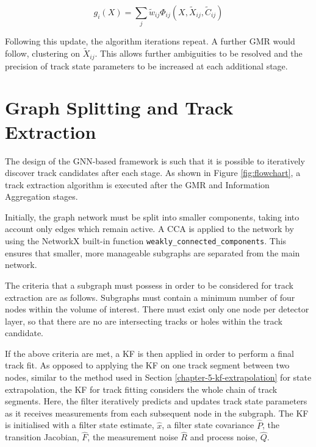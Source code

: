 \begin{equation}
g_i(X) = \sum_{j} \widetilde{w}_{ij}\Phi_{ij}(X, \widetilde{X}_{ij}, \widetilde{C}_{ij})
\label{eqn:updated-gaussian-mixture}
\end{equation}

Following this update, the algorithm iterations repeat. A further GMR would follow, clustering on $\widetilde{X}_{ij}$. This allows further ambiguities to be resolved and the precision of track state parameters to be increased at each additional stage.






\section{Graph Splitting and Track Extraction}
\label{gnn-track-extration}

The design of the GNN-based framework is such that it is possible to iteratively discover track candidates after each stage. As shown in Figure \ref{fig:flowchart}, a track extraction algorithm is executed after the GMR and Information Aggregation stages.

Initially, the graph network must be split into smaller components, taking into account only edges which remain active. A CCA is applied to the network by using the NetworkX built-in function \texttt{weakly\_connected\_components}. This ensures that smaller, more manageable subgraphs are separated from the main network.

The criteria that a subgraph must possess in order to be considered for track extraction are as follows. Subgraphs must contain a minimum number of four nodes within the volume of interest. There must exist only one node per detector layer, so that there are no are intersecting tracks or holes within the track candidate. 

If the above criteria are met, a KF is then applied in order to perform a final track fit. As opposed to applying the KF on one track segment between two nodes, similar to the method used in Section \ref{chapter-5-kf-extrapolation} for state extrapolation, the KF for track fitting considers the whole chain of track segments. Here, the filter iteratively predicts and updates track state parameters as it receives measurements from each subsequent node in the subgraph. The KF is initialised with a filter state estimate, $\hat{x}$, a filter state covariance $\hat{P}$, the transition Jacobian, $\hat{F}$, the measurement noise $\hat{R}$ and process noise, $\hat{Q}$.


